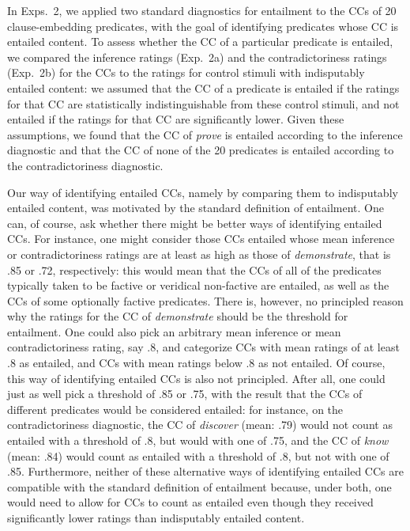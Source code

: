 \documentclass[11pt,fleqn]{article}
\newcommand{\6}{\mbox{$[\hspace*{-.6mm}[$}}
\newcommand{\9}{\mbox{$]\hspace*{-.6mm}]$}}
\begin{document}
{In Exps.~2, we applied two standard diagnostics for entailment to the CCs of 20 clause-embedding predicates, with the goal of identifying predicates whose CC is entailed content. To assess whether the CC of a particular predicate is entailed, we compared the inference ratings (Exp.~2a) and the contradictoriness ratings (Exp.~2b) for the CCs to the ratings for control stimuli with indisputably entailed content: we assumed that the CC of a predicate is entailed if the ratings for that CC are statistically indistinguishable from these control stimuli, and not entailed if the ratings for that CC are significantly lower. Given these assumptions, we found that the CC of {\em prove} is entailed according to the inference diagnostic and that the CC of none of the 20 predicates is entailed according to the contradictoriness diagnostic. 

Our way of identifying entailed CCs, namely by comparing them to indisputably entailed content, was motivated by the standard definition of entailment. One can, of course, ask whether there might be better ways of identifying entailed CCs. For instance, one might consider those CCs entailed whose mean inference or contradictoriness ratings are at least as high as those of {\em demonstrate}, that is .85 or .72, respectively: this would mean that the CCs of all of the predicates typically taken to be factive or veridical non-factive are entailed, as well as the CCs of some optionally factive predicates. There is, however, no principled reason why the ratings for the CC of {\em demonstrate} should be the threshold for entailment. One could also pick an arbitrary mean inference or mean contradictoriness rating, say .8, and categorize CCs with mean ratings of at least .8 as entailed, and CCs with mean ratings below .8 as not entailed. Of course, this way of identifying entailed CCs is also not principled. After all, one could just as well pick a threshold of .85 or .75, with the result that the CCs of different predicates would be considered entailed: for instance, on the contradictoriness diagnostic, the CC of {\em discover} (mean: .79) would not count as entailed with a threshold of .8, but would with one of .75, and the CC of {\em know} (mean: .84) would count as entailed with a threshold of .8, but not with one  of .85. Furthermore, neither of these alternative ways of identifying entailed CCs are compatible with the standard definition of entailment because, under both, one would need to allow for CCs to count as entailed even though they received significantly lower ratings than indisputably entailed content.

}
\end{document}
